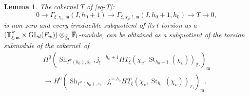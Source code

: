 \documentclass[JEP,XML,SOM,Unicode,published]{cedram}
\DeclareMathOperator{\GL}{GL}
\theoremstyle{plain}
\newtheorem{lemma}[equation]{Lemma}
\theoremstyle{definition}
\numberwithin{equation}{subsection}
\newcommand\Tm{{\mathbb T}}
\newcommand\Fm{{\mathbb F}}
\newcommand\Zm{{\mathbb Z}}
\DeclareMathOperator{\sh}{Sh}
\DeclareMathOperator{\st}{St}
\begin{document}
\begin{lemma} \label{lem-important}
The cokernel $T$ of \eqref{eq-T}:\vspace*{-3pt}
\[
0 \to \Gamma_{\xi,\chi_v,\mathfrak m}(I,h_0+1)
\to \Gamma_{\xi,\chi_v,!,\mathfrak m}
(I,h_0+1,h_0) \to T \to 0,
\]
is non zero and every irreducible subquotient of its $l$-torsion as a
$(\Tm_{\xi,\mathfrak m}^S \times\nobreak \GL_d(F_w)) \otimes_{\overline \Zm_l} \overline \Fm_l$-module,
can be obtained as a subquotient of the torsion submodule of
the cokernel~of\vspace*{-3pt}
\begin{multline} \label{eq-torsion-trop2}
H^{0}(\sh_{I^w(h_0),\bar s_v},j^{=h_0+1}_!
HT_\xi(\chi_v,\st_{h_0+1}(\chi_v))_{\overline \Zm_l})_{\mathfrak m} \\
\to H^0(\sh_{I^w(h_0),\bar s_v},j^{=h_0}_!
HT_\xi(\chi_v,\st_{h_0}(\chi_v))_{\overline \Zm_l})_{\mathfrak m}.
\end{multline}
\end{lemma}
\end{document}
